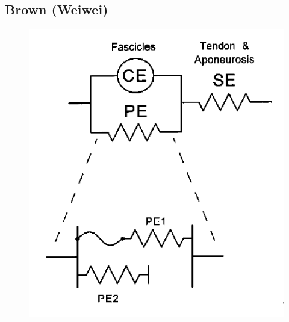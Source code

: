 \documentclass[pdftex,a4paper,11pt]{report}
\numberwithin{equation}{subsection}
\begin{document}

\subsection{Brown (Weiwei)}

\begin{figure}[h]
    \centering
    \includegraphics[width=.30\linewidth]{fig/brown}
\end{figure}
\end{document}
